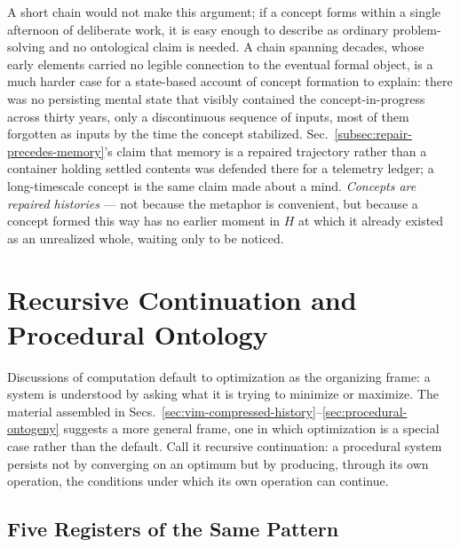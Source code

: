 \documentclass[12pt,a4paper]{article}
\theoremstyle{plain}
\theoremstyle{definition}
\theoremstyle{remark}
\begin{document}
A short chain would not make this argument; if a concept forms within a single afternoon of deliberate work, it is easy enough to describe as ordinary problem-solving and no ontological claim is needed. A chain spanning decades, whose early elements carried no legible connection to the eventual formal object, is a much harder case for a state-based account of concept formation to explain: there was no persisting mental state that visibly contained the concept-in-progress across thirty years, only a discontinuous sequence of inputs, most of them forgotten as inputs by the time the concept stabilized. Sec.~\ref{subsec:repair-precedes-memory}'s claim that memory is a repaired trajectory rather than a container holding settled contents was defended there for a telemetry ledger; a long-timescale concept is the same claim made about a mind. \emph{Concepts are repaired histories} — not because the metaphor is convenient, but because a concept formed this way has no earlier moment in $H$ at which it already existed as an unrealized whole, waiting only to be noticed.

\section{Recursive Continuation and Procedural Ontology}
\label{sec:recursive-continuation}

Discussions of computation default to optimization as the organizing frame: a system is understood by asking what it is trying to minimize or maximize. The material assembled in Secs.~\ref{sec:vim-compressed-history}--\ref{sec:procedural-ontogeny} suggests a more general frame, one in which optimization is a special case rather than the default. Call it recursive continuation: a procedural system persists not by converging on an optimum but by producing, through its own operation, the conditions under which its own operation can continue.

\subsection{Five Registers of the Same Pattern}
\label{subsec:five-registers}
\end{document}
